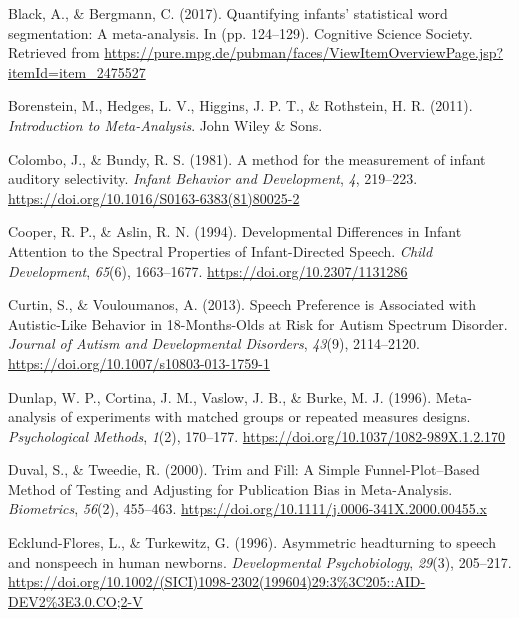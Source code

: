 \documentclass[man]{apa6}
\begin{document}
\leavevmode\hypertarget{ref-black_quantifying_2017}{}%
Black, A., \& Bergmann, C. (2017). Quantifying infants' statistical word segmentation: A meta-analysis. In (pp. 124--129). Cognitive Science Society. Retrieved from \url{https://pure.mpg.de/pubman/faces/ViewItemOverviewPage.jsp?itemId=item_2475527}

\leavevmode\hypertarget{ref-borenstein_introduction_2011}{}%
Borenstein, M., Hedges, L. V., Higgins, J. P. T., \& Rothstein, H. R. (2011). \emph{Introduction to Meta-Analysis}. John Wiley \& Sons.

\leavevmode\hypertarget{ref-colombo_method_1981}{}%
Colombo, J., \& Bundy, R. S. (1981). A method for the measurement of infant auditory selectivity. \emph{Infant Behavior and Development}, \emph{4}, 219--223. \url{https://doi.org/10.1016/S0163-6383(81)80025-2}

\leavevmode\hypertarget{ref-cooper_developmental_1994}{}%
Cooper, R. P., \& Aslin, R. N. (1994). Developmental Differences in Infant Attention to the Spectral Properties of Infant-Directed Speech. \emph{Child Development}, \emph{65}(6), 1663--1677. \url{https://doi.org/10.2307/1131286}

\leavevmode\hypertarget{ref-curtin_speech_2013}{}%
Curtin, S., \& Vouloumanos, A. (2013). Speech Preference is Associated with Autistic-Like Behavior in 18-Months-Olds at Risk for Autism Spectrum Disorder. \emph{Journal of Autism and Developmental Disorders}, \emph{43}(9), 2114--2120. \url{https://doi.org/10.1007/s10803-013-1759-1}

\leavevmode\hypertarget{ref-dunlap_meta-analysis_1996}{}%
Dunlap, W. P., Cortina, J. M., Vaslow, J. B., \& Burke, M. J. (1996). Meta-analysis of experiments with matched groups or repeated measures designs. \emph{Psychological Methods}, \emph{1}(2), 170--177. \url{https://doi.org/10.1037/1082-989X.1.2.170}

\leavevmode\hypertarget{ref-duval_trim_2000}{}%
Duval, S., \& Tweedie, R. (2000). Trim and Fill: A Simple Funnel-Plot--Based Method of Testing and Adjusting for Publication Bias in Meta-Analysis. \emph{Biometrics}, \emph{56}(2), 455--463. \url{https://doi.org/10.1111/j.0006-341X.2000.00455.x}

\leavevmode\hypertarget{ref-ecklund-flores_asymmetric_1996}{}%
Ecklund-Flores, L., \& Turkewitz, G. (1996). Asymmetric headturning to speech and nonspeech in human newborns. \emph{Developmental Psychobiology}, \emph{29}(3), 205--217. \url{https://doi.org/10.1002/(SICI)1098-2302(199604)29:3\%3C205::AID-DEV2\%3E3.0.CO;2-V}
\end{document}
